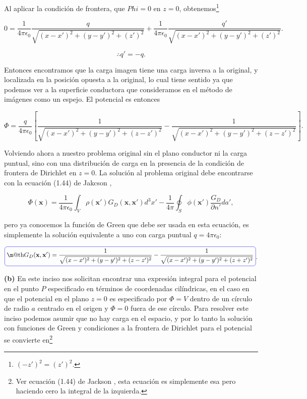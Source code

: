 \documentclass[a4paper,11pt]{article}
\makeatletter
\numberwithin{equation}{section}
\newcommand*{\boxcolor}{blue}
\renewcommand{\boxed}[1]{\textcolor{\boxcolor}{%
\tikz[baseline={([yshift=-1ex]current bounding box.center)}] \node [rectangle, minimum width=1ex,rounded corners,draw] {\normalcolor\m@th$\displaystyle#1$};}}
\makeatother
\begin{document}
Al aplicar la condición de frontera, que $Phi = 0$ en $z = 0$, obtenemos\footnote{
$(-z')^2 = (z')^2$.}

\begin{equation}
  0 = \frac{1}{4\pi\epsilon_0}\frac{q}{\sqrt{(x-x')^2 + (y-y')^2 + (z')^2}} + 
 \frac{1}{4\pi\epsilon_0}\frac{q'}{\sqrt{(x-x')^2 + (y-y')^2 + (z')^2}}.
\end{equation}

\begin{equation}
 \therefore q' = -q.
\end{equation}

Entonces encontramos que la carga imagen tiene una carga inversa a la original, y 
localizada en la posición opuesta a la original, lo cual tiene sentido ya que podemos 
ver a la superficie conductora que consideramos en el método de imágenes como un 
espejo. El potencial es entonces 

\begin{equation*}
  \Phi = \frac{q}{4\pi\epsilon_0}\left[\frac{1}{\sqrt{(x-x')^2 + (y-y')^2 + (z-z')^2}} - 
 \frac{1}{\sqrt{(x-x')^2 + (y-y')^2 + (z-z')^2}}\right].
\end{equation*}

Volviendo ahora a nuestro problema original sin el plano conductor ni la carga 
puntual, sino con una distribución de carga en la presencia de la condición de 
frontera de Dirichlet en $z=0$. La solución al problema original debe encontrarse 
con la ecuación (1.44) de Jakcson \cite{jackson3}, 

\begin{equation}
 \Phi(\mathbf{x}) = \frac{1}{4\pi\epsilon_0} \int_V \rho(\mathbf{x}')G_D(\mathbf{x},
 \mathbf{x}')d^3x' - \frac{1}{4\pi}\oint_S \phi(\mathbf{x}')\frac{G_D}{\partial n'}da',
\end{equation}

pero ya conocemos la función de Green que debe ser usada en esta ecuación, es simplemente 
la solución equivalente a uno con carga puntual $q = 4\pi\epsilon_0$: 

\begin{equation*}
 \boxed{G_D(\mathbf{x},\mathbf{x}') = \frac{1}{\sqrt{(x-x')^2 + (y-y')^2 + (z-z')^2}} - 
 \frac{1}{\sqrt{(x-x')^2 + (y-y')^2 + (z+z')^2}}}.
\end{equation*}

\textbf{(b)} En este inciso nos solicitan encontrar una expresión integral para 
el potencial en el punto $P$ especificado en términos de coordenadas cilíndricas, en 
el caso en que el potencial en el plano $z=0$ es especificado por $\Phi = V$ dentro 
de un círculo de radio $a$ centrado en el origen y $\Phi = 0$ fuera de ese círculo. 
Para resolver este inciso podemos asumir que no hay carga en el espacio, y por lo tanto 
la solución con funciones de Green y condiciones a la frontera de Dirichlet para 
el potencial se convierte en\footnote{Ver ecuación (1.44) de Jackson \cite{jackson3}, 
esta ecuación es simplemente esa pero haciendo cero la integral de la izquierda.}
\end{document}
